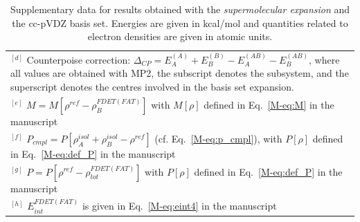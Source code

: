 \documentclass[amsmath,amssymb,preprint,aip,jcp]{revtex4-1}
\begin{document}
\begin{table}[H]
\begin{center}
{\begin{tabular}{|l|l|l|l|l|l|l|l|l|l|}
\multicolumn{10}{p{1.0\textwidth}}{$^{[d]}$ Counterpoise correction: $\Delta_{CP} = E_{A}^{(A)} + E_{B}^{(B)} - E_{A}^{(AB)} - E_{B}^{(AB)}$, where all values are obtained with MP2, the subscript denotes the subsystem, and the superscript denotes the centres involved in the basis set expansion.} \\
\multicolumn{10}{p{1.0\textwidth}}{$^{[e]}$ $M=M[\rho^{ref} - \rho^{FDET(FAT)}_{B}]$ with $M[\rho]$ defined in Eq.~\ref{M-eq:M} in the manuscript}\\
\multicolumn{10}{p{1.0\textwidth}}{$^{[f]}$ $P_{cmpl}=P[\rho_A^{isol}+\rho_B^{isol} - \rho^{ref}]$ (cf. Eq.~\ref{M-eq:p_cmpl}), with $P[\rho]$ defined in Eq.~\ref{M-eq:def_P} in the manuscript}\\
\multicolumn{10}{p{1.0\textwidth}}{$^{[g]}$ $P=P[\rho^{ref} - \rho_{tot}^{FDET(FAT)}]$ with $P[\rho]$ defined in Eq.~\ref{M-eq:def_P} in the manuscript}\\
\multicolumn{10}{p{1.0\textwidth}}{$^{[h]}$ $E^{FDET(FAT)}_{int}$ is given in Eq.~\ref{M-eq:eint4} in the manuscript}\\
\end{tabular}
}
\end{center}
\caption{Supplementary data for results obtained with the \textit{supermolecular expansion} and the cc-pVDZ basis set. Energies are given in kcal/mol and quantities related to electron densities are given in atomic units.}
\end{table}
\end{document}
